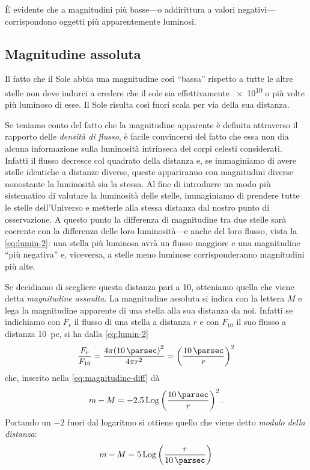         È evidente che a magnitudini più basse---o addirittura a valori negativi---corrispondono oggetti più apparentemente luminosi.
    \subsection{Magnitudine assoluta}
        Il fatto che il Sole abbia una magnitudine così ``bassa'' rispetto a tutte le altre stelle non deve indurci a credere che il sole sia effettivamente \num{e10} o più volte più luminoso di esse. Il Sole risulta così fuori scala per via della sua distanza.

        Se teniamo conto del fatto che la magnitudine apparente è definita attraverso il rapporto delle \emph{densità di flusso}, è facile convincersi del fatto che essa non dia alcuna informazione sulla luminosità intrinseca dei corpi celesti considerati. Infatti il flusso decresce col quadrato della distanza e, se immaginiamo di avere stelle identiche a distanze diverse, queste appariranno con magnitudini diverse nonostante la luminosità sia la stessa. Al fine di introdurre un modo più sistematico di valutare la luminosità delle stelle, immaginiamo di prendere tutte le stelle dell'Universo e metterle alla stessa distanza dal nostro punto di osservazione. A questo punto la differenza di magnitudine tra due stelle sarà coerente con la differenza delle loro luminosità---e anche del loro flusso, vista la \eqref{eq:lumin-2}: una stella più luminosa avrà un flusso maggiore e una magnitudine ``più negativa'' e, viceversa, a stelle meno luminose corrisponderanno magnitudini più alte.
        
        Se decidiamo di scegliere questa distanza pari a \SI{10}{\parsec}, otteniamo quella che viene detta \emph{magnitudine assoulta}. La magnitudine assoluta si indica con la lettera $M$ e lega la magnitudine apparente di una stella alla sua distanza da noi. Infatti se indichiamo con $F_r$ il flusso di una stella a distanza $r$ e con $F_{10}$ il suo flusso a distanza \SI{10}{pc}, si ha dalla \eqref{eq:lumin-2}
        \begin{equation*}
            \frac{F_r}{F_{10}} = \frac{4 \pi \pqty{\SI{10}{\parsec}}^2}{4 \pi r^2} = \pqty{\frac{\SI{10}{\parsec}}{r}}^2
        \end{equation*}
        che, inserito nella \eqref{eq:magnitudine-diff} dà
        \begin{equation*}
            m - M = -2.5 \Log{\pqty{\frac{\SI{10}{\parsec}}{r}}}^2
            \myperiod
        \end{equation*}
        Portando un $-2$ fuori dal logaritmo si ottiene quello che viene detto \emph{modulo della distanza}:
        \begin{equation}
            \label{eq:modulo-distanza}
            m - M = 5 \Log{\pqty{\frac{r}{\SI{10}{\parsec}}}}
        \end{equation}
